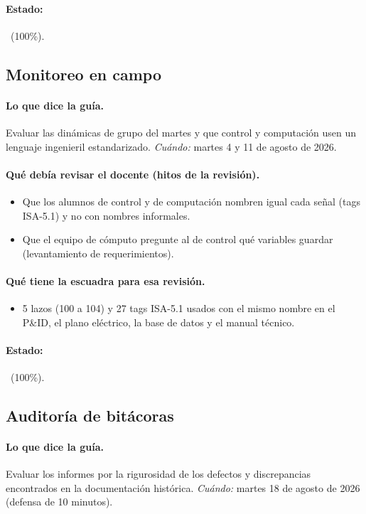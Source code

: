 \documentclass[a4paper,11pt]{article}
\begin{document}
\paragraph{Estado:} \cumple~(100\%).
\subsection{Monitoreo en campo}
\paragraph{Lo que dice la guía.} Evaluar las dinámicas de grupo del martes y que control y computación usen un lenguaje ingenieril estandarizado. \textit{Cuándo:} martes 4 y 11 de agosto de 2026.
\paragraph{Qué debía revisar el docente (hitos de la revisión).}
\begin{itemize}
\item[$\square$] Que los alumnos de control y de computación nombren igual cada señal (tags ISA-5.1) y no con nombres informales.
\item[$\square$] Que el equipo de cómputo pregunte al de control qué variables guardar (levantamiento de requerimientos).
\end{itemize}
\paragraph{Qué tiene la escuadra para esa revisión.}
\begin{itemize}
\item 5 lazos (100 a 104) y 27 tags ISA-5.1 usados con el mismo nombre en el P\&ID, el plano eléctrico, la base de datos y el manual técnico.
\end{itemize}
\paragraph{Estado:} \cumple~(100\%).
\subsection{Auditoría de bitácoras}
\paragraph{Lo que dice la guía.} Evaluar los informes por la rigurosidad de los defectos y discrepancias encontrados en la documentación histórica. \textit{Cuándo:} martes 18 de agosto de 2026 (defensa de 10 minutos).
\end{document}
